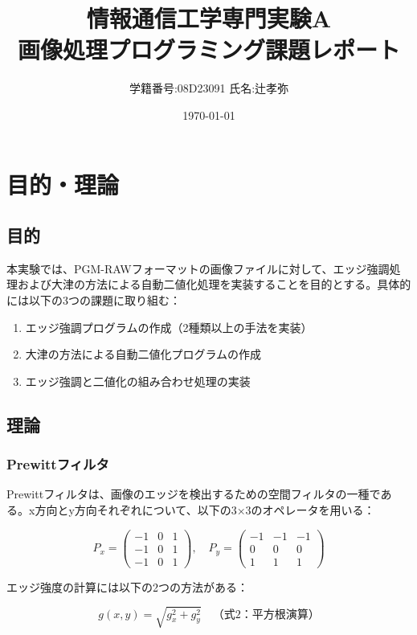 \documentclass[a4paper,12pt]{jsarticle}
\title{情報通信工学専門実験A\\画像処理プログラミング課題レポート}
\author{学籍番号:08D23091 氏名:辻孝弥}
\date{\today}
\begin{document}
\maketitle

\section{目的・理論}

\subsection{目的}
本実験では、PGM-RAWフォーマットの画像ファイルに対して、エッジ強調処理および大津の方法による自動二値化処理を実装することを目的とする。具体的には以下の3つの課題に取り組む：

\begin{enumerate}
\item エッジ強調プログラムの作成（2種類以上の手法を実装）
\item 大津の方法による自動二値化プログラムの作成
\item エッジ強調と二値化の組み合わせ処理の実装
\end{enumerate}

\subsection{理論}

\subsubsection{Prewittフィルタ}
Prewittフィルタは、画像のエッジを検出するための空間フィルタの一種である。x方向とy方向それぞれについて、以下の3×3のオペレータを用いる：

\begin{equation}
P_x = \begin{pmatrix}
-1 & 0 & 1 \\
-1 & 0 & 1 \\
-1 & 0 & 1
\end{pmatrix}, \quad
P_y = \begin{pmatrix}
-1 & -1 & -1 \\
0 & 0 & 0 \\
1 & 1 & 1
\end{pmatrix}
\end{equation}

エッジ強度の計算には以下の2つの方法がある：

\begin{equation}
g(x,y) = \sqrt{g_x^2 + g_y^2} \quad \text{（式2：平方根演算）}
\end{equation}
\end{document}
